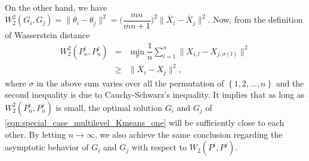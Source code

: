 On the other hand, we have $W_{2}^{2}(G_{i},G_{j})=\|\theta_{i}-\theta_{j}\|^{2}=
\biggr(\dfrac{mn}{mn+1}\biggr)^{2}\|\overline{X}_{i}-\overline{X}_{j}\|^{2}$. Now, 
from the definition of Wasserstein distance
\vspace{-6pt}
\begin{eqnarray}
W_{2}^{2}(P_{n}^{i},P_{n}^{j}) & = & \mathop {\min }\limits_{\sigma}{\dfrac{1}{n}\sum \limits_{l=1}^{n}{\|X_{i,l}-X_{j,\sigma(l)}\|^{2}}} \nonumber \\
& \geq & \|\overline{X}_{i}-\overline{X}_{j}\|^{2}, \nonumber
\end{eqnarray}
where $\sigma$ in the above sum varies over all the permutation of $\left\{1,2,\ldots,n
\right\}$ and the second inequality is due to Cauchy-Schwarz's inequality. It implies that as 
long as $W_{2}^{2}(P_{n}^{i},P_{n}^{j})$ is small, the optimal solution $G_{i}$ and $G_{j}
$ of \eqref{eqn:special_case_multilevel_Kmeans_one} will be sufficiently close to each 
other. By letting $n \to \infty$, we also achieve the same conclusion regarding the 
asymptotic behavior of $G_{i}$ and $G_{j}$ with respect to $W_2(P^{i},P^{j})$.

%
%
%
